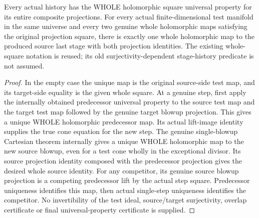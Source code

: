 \begin{theorem}
\label{hir:submersion-cartesian-tower-whole-universal}
\leanok
{}
Every actual history has the WHOLE holomorphic square universal property
for its entire composite projections. For every actual finite-dimensional
test manifold in the same universe and every two genuine whole holomorphic
maps satisfying the original projection square, there is exactly one whole
holomorphic map to the produced source last stage with both projection
identities. The existing whole-square notation is reused; its old
surjectivity-dependent stage-history predicate is not assumed.
\end{theorem}
\begin{proof}
In the empty case the unique map is the original source-side test map,
and its target-side equality is the given whole square. At a genuine step,
first apply the internally obtained predecessor universal property to the
source test map and the target test map followed by the genuine target
blowup projection. This gives a unique WHOLE holomorphic predecessor map.
Its actual lift-image identity supplies the true cone equation for the
new step. The genuine single-blowup Cartesian theorem internally gives a
unique WHOLE holomorphic map to the new source blowup, even for a test cone
wholly in the exceptional divisor. Its source projection identity composed
with the predecessor projection gives the desired whole source identity.
For any competitor, its genuine source blowup projection is a competing
predecessor lift by the actual step square. Predecessor uniqueness identifies
this map, then actual single-step uniqueness identifies the competitor.
No invertibility of the test ideal, source/target surjectivity, overlap
certificate or final universal-property certificate is supplied.
\end{proof}

